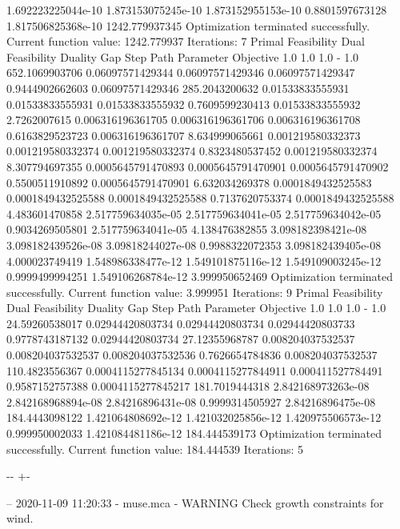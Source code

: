 \documentclass[letterpaper,10pt,english]{sphinxmanual}
\newlength\nbsphinxcodecellspacing
\begin{document}
{\begin{sphinxVerbatim}[commandchars=\\\{\}]
1.692223225044e-10  1.873153075245e-10  1.873152955153e-10  0.8801597673128  1.817506825368e-10  1242.779937345
Optimization terminated successfully.
         Current function value: 1242.779937
         Iterations: 7
Primal Feasibility  Dual Feasibility    Duality Gap         Step             Path Parameter      Objective
1.0                 1.0                 1.0                 -                1.0                 652.1069903706
0.06097571429344    0.06097571429346    0.06097571429347    0.9444902662603  0.06097571429346    285.2043200632
0.01533833555931    0.01533833555931    0.01533833555932    0.7609599230413  0.01533833555932    2.7262007615
0.006316196361705   0.006316196361706   0.006316196361708   0.6163829523723  0.006316196361707   8.634999065661
0.001219580332373   0.001219580332374   0.001219580332374   0.8323480537452  0.001219580332374   8.307794697355
0.0005645791470893  0.0005645791470901  0.0005645791470902  0.5500511910892  0.0005645791470901  6.632034269378
0.0001849432525583  0.0001849432525588  0.0001849432525588  0.7137620753374  0.0001849432525588  4.483601470858
2.517759634035e-05  2.517759634041e-05  2.517759634042e-05  0.9034269505801  2.517759634041e-05  4.138476382855
3.098182398421e-08  3.098182439526e-08  3.09818244027e-08   0.9988322072353  3.098182439405e-08  4.000023749419
1.548986338477e-12  1.549101875116e-12  1.549109003245e-12  0.9999499994251  1.549106268784e-12  3.999950652469
Optimization terminated successfully.
         Current function value: 3.999951
         Iterations: 9
Primal Feasibility  Dual Feasibility    Duality Gap         Step             Path Parameter      Objective
1.0                 1.0                 1.0                 -                1.0                 24.59260538017
0.02944420803734    0.02944420803734    0.02944420803733    0.9778743187132  0.02944420803734    27.12355968787
0.008204037532537   0.008204037532537   0.008204037532536   0.7626654784836  0.008204037532537   110.4823556367
0.0004115277845134  0.0004115277844911  0.000411527784491   0.9587152757388  0.0004115277845217  181.7019444318
2.842168973263e-08  2.842168968894e-08  2.84216896431e-08   0.9999314505927  2.84216896475e-08   184.4443098122
1.421064808692e-12  1.421032025856e-12  1.420975506573e-12  0.999950002033   1.421084481186e-12  184.444539173
Optimization terminated successfully.
         Current function value: 184.444539
         Iterations: 5
\end{sphinxVerbatim}
}

{

\kern-\sphinxverbatimsmallskipamount\kern-\baselineskip
\kern+\FrameHeightAdjust\kern-\fboxrule
\vspace{\nbsphinxcodecellspacing}

\begin{sphinxVerbatim}[commandchars=\\\{\}]
-- 2020-11-09 11:20:33 - muse.mca - WARNING
Check growth constraints for wind.

\end{sphinxVerbatim}
}
\end{document}
